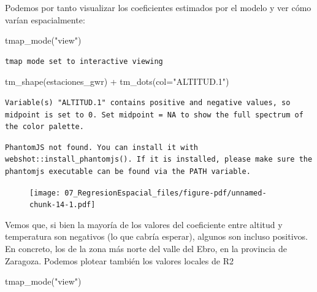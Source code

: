 \documentclass[
  letterpaper,
  DIV=11,
  numbers=noendperiod]{scrreprt}
\newenvironment{Shaded}{\begin{snugshade}}{\end{snugshade}}
\newcommand{\AttributeTok}[1]{\textcolor[rgb]{0.40,0.45,0.13}{#1}}
\newcommand{\FunctionTok}[1]{\textcolor[rgb]{0.28,0.35,0.67}{#1}}
\newcommand{\NormalTok}[1]{\textcolor[rgb]{0.00,0.23,0.31}{#1}}
\newcommand{\SpecialCharTok}[1]{\textcolor[rgb]{0.37,0.37,0.37}{#1}}
\newcommand{\StringTok}[1]{\textcolor[rgb]{0.13,0.47,0.30}{#1}}
\begin{document}
Podemos por tanto visualizar los coeficientes estimados por el modelo y
ver cómo varían espacialmente:

\begin{Shaded}
\begin{Highlighting}[]
\FunctionTok{tmap\_mode}\NormalTok{(}\StringTok{"view"}\NormalTok{)}
\end{Highlighting}
\end{Shaded}

\begin{verbatim}
tmap mode set to interactive viewing
\end{verbatim}

\begin{Shaded}
\begin{Highlighting}[]
\FunctionTok{tm\_shape}\NormalTok{(estaciones\_gwr) }\SpecialCharTok{+}
    \FunctionTok{tm\_dots}\NormalTok{(}\AttributeTok{col=}\StringTok{"ALTITUD.1"}\NormalTok{)}
\end{Highlighting}
\end{Shaded}

\begin{verbatim}
Variable(s) "ALTITUD.1" contains positive and negative values, so midpoint is set to 0. Set midpoint = NA to show the full spectrum of the color palette.
\end{verbatim}

\begin{verbatim}
PhantomJS not found. You can install it with webshot::install_phantomjs(). If it is installed, please make sure the phantomjs executable can be found via the PATH variable.
\end{verbatim}

\begin{figure}[H]

{\centering \texttt{[image: 07\_RegresionEspacial\_files/figure-pdf/unnamed-chunk-14-1.pdf]}

}

\end{figure}

Vemos que, si bien la mayoría de los valores del coeficiente entre
altitud y temperatura son negativos (lo que cabría esperar), algunos son
incluso positivos. En concreto, los de la zona más norte del valle del
Ebro, en la provincia de Zaragoza. Podemos plotear también los valores
locales de R2

\begin{Shaded}
\begin{Highlighting}[]
\FunctionTok{tmap\_mode}\NormalTok{(}\StringTok{"view"}\NormalTok{)}
\end{Highlighting}
\end{Shaded}
\end{document}
